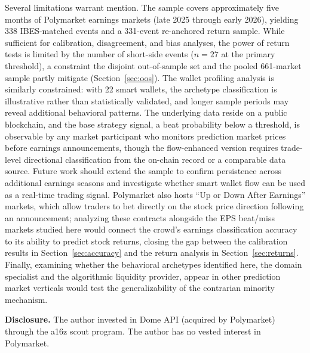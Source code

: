 \documentclass[11pt]{article}
\begin{document}
Several limitations warrant mention. The sample covers approximately five months of Polymarket earnings markets (late 2025 through early 2026), yielding 338 IBES-matched events and a 331-event re-anchored return sample. While sufficient for calibration, disagreement, and bias analyses, the power of return tests is limited by the number of short-side events ($n = 27$ at the primary threshold), a constraint the disjoint out-of-sample set and the pooled 661-market sample partly mitigate (Section~\ref{sec:oos}). The wallet profiling analysis is similarly constrained: with 22 smart wallets, the archetype classification is illustrative rather than statistically validated, and longer sample periods may reveal additional behavioral patterns. The underlying data reside on a public blockchain, and the base strategy signal, a beat probability below a threshold, is observable by any market participant who monitors prediction market prices before earnings announcements, though the flow-enhanced version requires trade-level directional classification from the on-chain record or a comparable data source. Future work should extend the sample to confirm persistence across additional earnings seasons and investigate whether smart wallet flow can be used as a real-time trading signal. Polymarket also hosts ``Up or Down After Earnings'' markets, which allow traders to bet directly on the stock price direction following an announcement; analyzing these contracts alongside the EPS beat/miss markets studied here would connect the crowd's earnings classification accuracy to its ability to predict stock returns, closing the gap between the calibration results in Section~\ref{sec:accuracy} and the return analysis in Section~\ref{sec:returns}. Finally, examining whether the behavioral archetypes identified here, the domain specialist and the algorithmic liquidity provider, appear in other prediction market verticals would test the generalizability of the contrarian minority mechanism.

\bigskip

\noindent\textbf{Disclosure.} The author invested in Dome API (acquired by Polymarket) through the a16z scout program. The author has no vested interest in Polymarket.

\newpage


\end{document}
